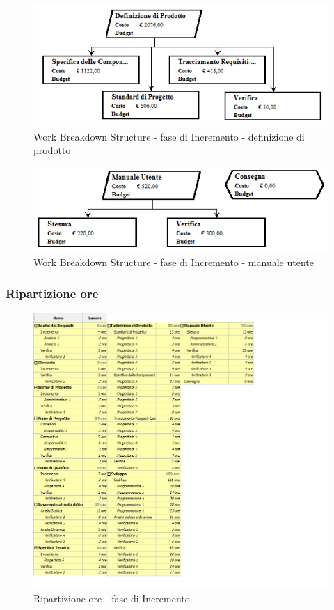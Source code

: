 \documentclass[a4paper]{article}
\begin{document}
				\begin{figure}[H]
					\centering
					\includegraphics[width=\textwidth]{wbs/wbs_incremento_9}
					\caption{Work Breakdown Structure - fase di Incremento - definizione di prodotto}
				\end{figure}
				\begin{figure}[H]
					\centering
					\includegraphics[width=\textwidth]{wbs/wbs_incremento_10}
					\caption{Work Breakdown Structure - fase di Incremento - manuale utente}
				\end{figure}
				
			\subsubsection{Ripartizione ore}
				\begin{figure}[H]
					\centering
					\includegraphics[width=\textwidth]{ro_incremento}
					\caption{Ripartizione ore - fase di Incremento.}
				\end{figure}
				
\end{document}

